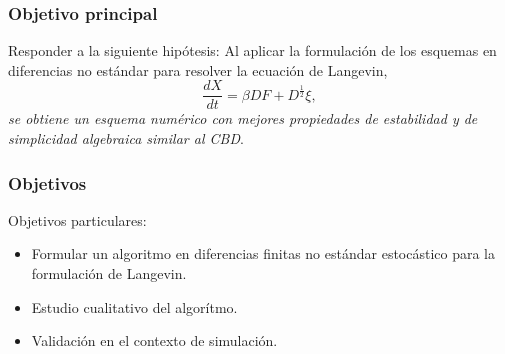 \begin{bibunit}[aalpha] 
  \begin{frame}
    \frametitle{Objetivo principal}
    \begin{alertblock}{Responder a la siguiente hip\'otesis:}
      Al aplicar la formulaci\'on de los esquemas en diferencias no est\'andar \cite{Mickens:2005} para
      resolver la ecuaci\'on  de Langevin,
        $$
          \frac{dX}{dt}=\beta D F+D^{\frac{1}{2}}\xi,
        $$
      \emph{se obtiene un esquema num\'erico con mejores propiedades de estabilidad y de simplicidad algebraica
      similar al   CBD}.
    \end{alertblock}
  \end{frame}
\end{bibunit}
\begin{frame}
    \frametitle{Objetivos}
    \begin{exampleblock}{Objetivos particulares:}
      \begin{itemize}
        \item
          Formular un algoritmo en diferencias finitas no estándar estocástico para la formulación de Langevin.
        \item
          Estudio cualitativo del algorítmo.
        \item
          Validación  en el contexto de simulaci\'on.
      \end{itemize}
    \end{exampleblock}
  \end{frame}
